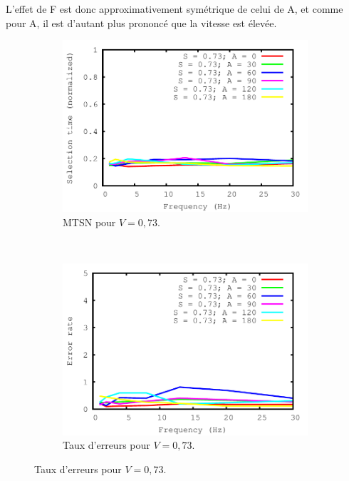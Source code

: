 	L'effet de F est donc approximativement symétrique de celui de A, et comme pour A, il est d'autant plus prononcé que la vitesse est élevée.

	\begin{figure}[!htb]
		\centering
		\begin{subfigure}[t]{\subImgWlineplot}
			\centering
			\includegraphics[width=\textwidth]{figures/ch4/frequency_speed_0_73_times}
			\caption{MTSN pour $V = 0,73$.}
			\label{fig:fEffect_t_073}
		\end{subfigure}
		~
		\begin{subfigure}[t]{\subImgWlineplot}
			\centering
			\includegraphics[width=\textwidth]{figures/ch4/frequency_speed_0_73_errors}
			\caption{Taux d'erreurs pour $V = 0,73$.}
			\label{fig:fEffect_e_073}
		\end{subfigure}

\end{figure}
